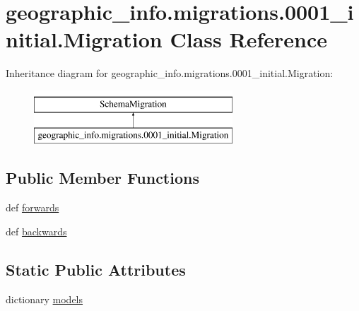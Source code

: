 \hypertarget{classgeographic__info_1_1migrations_1_10001__initial_1_1_migration}{\section{geographic\-\_\-info.\-migrations.0001\-\_\-initial.Migration Class Reference}
\label{classgeographic__info_1_1migrations_1_10001__initial_1_1_migration}
}
Inheritance diagram for geographic\-\_\-info.\-migrations.0001\-\_\-initial.Migration\-:\begin{figure}[H]
\begin{center}
\leavevmode
\includegraphics[height=2.000000cm]{classgeographic__info_1_1migrations_1_10001__initial_1_1_migration}
\end{center}
\end{figure}
\subsection*{Public Member Functions}
\begin{DoxyCompactItemize}
\item 
def \hyperlink{classgeographic__info_1_1migrations_1_10001__initial_1_1_migration_ab641111f13b160b7aac5a11e7aa68c37}{forwards}
\item 
def \hyperlink{classgeographic__info_1_1migrations_1_10001__initial_1_1_migration_a49b18cfe9a058089f9f093a07aca9590}{backwards}
\end{DoxyCompactItemize}
\subsection*{Static Public Attributes}
\begin{DoxyCompactItemize}
\item 
dictionary \hyperlink{classgeographic__info_1_1migrations_1_10001__initial_1_1_migration_a19a57c6605f5393e0e78fd88b99db350}{models}
\end{DoxyCompactItemize}


